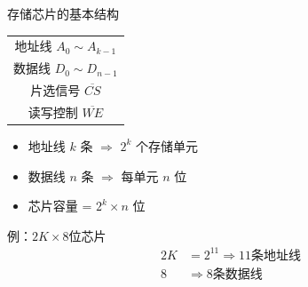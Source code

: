 \documentclass[10pt, aspectratio=169]{beamer}
\begin{document}
\begin{frame}{存储芯片的基本结构}
    \begin{center}
        \begin{tabular}{|c|}
            \hline
            地址线 $A_0 \sim A_{k-1}$ \\
            数据线 $D_0 \sim D_{n-1}$ \\
            片选信号 $\overline{CS}$ \\
            读写控制 $\overline{WE}$ \\
            \hline
        \end{tabular}
    \end{center}
    \vspace{0.5em}
    \begin{itemize}
        \item 地址线 $k$ 条 $\Rightarrow$ $2^k$ 个存储单元
        \item 数据线 $n$ 条 $\Rightarrow$ 每单元 $n$ 位
        \item 芯片容量 = $2^k \times n$ 位
    \end{itemize}
    \vspace{0.3em}
    \begin{exampleblock}{例：$2K \times 8$位芯片}
        \begin{align*}
            2K &= 2^{11} \Rightarrow 11\text{条地址线} \\
            8 &\Rightarrow 8\text{条数据线}
        \end{align*}
    \end{exampleblock}
\end{frame}
\end{document}
